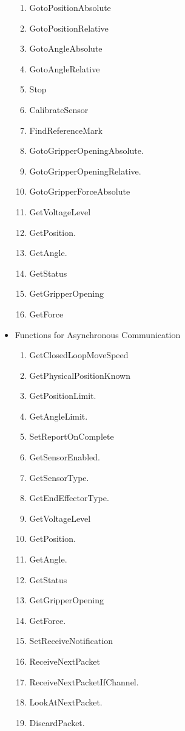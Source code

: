 \documentclass[10pt,letter,twoside]{report}
\begin{document}
\begin{itemize}
\begin{enumerate}
\item GotoPositionAbsolute 
\item GotoPositionRelative 
\item GotoAngleAbsolute 
\item GotoAngleRelative 
\item Stop 
\item CalibrateSensor 
\item FindReferenceMark 
\item GotoGripperOpeningAbsolute. 
\item GotoGripperOpeningRelative. 
\item GotoGripperForceAbsolute 
\item GetVoltageLevel 
\item GetPosition. 
\item GetAngle. 
\item GetStatus 
\item GetGripperOpening 
\item GetForce 
\end{enumerate}
\item Functions for Asynchronous Communication 
\begin{enumerate}
\item GetClosedLoopMoveSpeed 
\item GetPhysicalPositionKnown 
\item GetPositionLimit. 
\item GetAngleLimit. 
\item SetReportOnComplete 
\item GetSensorEnabled. 
\item GetSensorType. 
\item GetEndEffectorType. 
\item GetVoltageLevel 
\item GetPosition. 
\item GetAngle. 
\item GetStatus 
\item GetGripperOpening 
\item GetForce. 
\item SetReceiveNotification 
\item ReceiveNextPacket 
\item ReceiveNextPacketIfChannel. 
\item LookAtNextPacket. 
\item DiscardPacket.
\end{enumerate}
\end{itemize}
\end{document}
